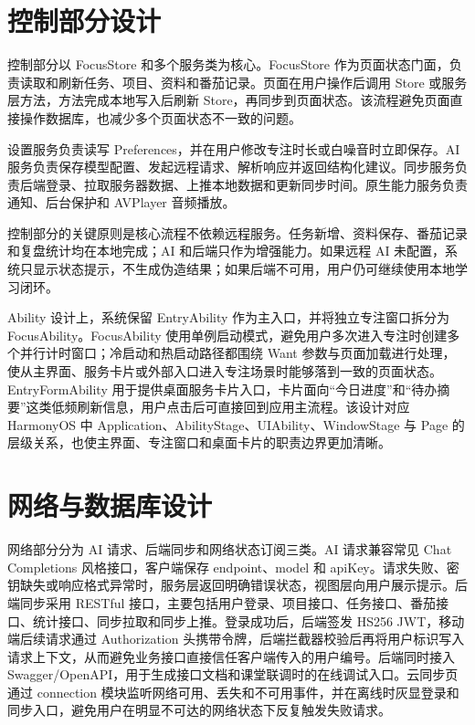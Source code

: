 \section{控制部分设计}

控制部分以 FocusStore 和多个服务类为核心。FocusStore 作为页面状态门面，负责读取和刷新任务、项目、资料和番茄记录。页面在用户操作后调用 Store 或服务层方法，方法完成本地写入后刷新 Store，再同步到页面状态。该流程避免页面直接操作数据库，也减少多个页面状态不一致的问题。

设置服务负责读写 Preferences，并在用户修改专注时长或白噪音时立即保存。AI 服务负责保存模型配置、发起远程请求、解析响应并返回结构化建议。同步服务负责后端登录、拉取服务器数据、上推本地数据和更新同步时间。原生能力服务负责通知、后台保护和 AVPlayer 音频播放。

控制部分的关键原则是核心流程不依赖远程服务。任务新增、资料保存、番茄记录和复盘统计均在本地完成；AI 和后端只作为增强能力。如果远程 AI 未配置，系统只显示状态提示，不生成伪造结果；如果后端不可用，用户仍可继续使用本地学习闭环。

Ability 设计上，系统保留 EntryAbility 作为主入口，并将独立专注窗口拆分为 FocusAbility。FocusAbility 使用单例启动模式，避免用户多次进入专注时创建多个并行计时窗口；冷启动和热启动路径都围绕 Want 参数与页面加载进行处理，使从主界面、服务卡片或外部入口进入专注场景时能够落到一致的页面状态。EntryFormAbility 用于提供桌面服务卡片入口，卡片面向“今日进度”和“待办摘要”这类低频刷新信息，用户点击后可直接回到应用主流程。该设计对应 HarmonyOS 中 Application、AbilityStage、UIAbility、WindowStage 与 Page 的层级关系，也使主界面、专注窗口和桌面卡片的职责边界更加清晰。

\section{网络与数据库设计}

网络部分分为 AI 请求、后端同步和网络状态订阅三类。AI 请求兼容常见 Chat Completions 风格接口，客户端保存 endpoint、model 和 apiKey。请求失败、密钥缺失或响应格式异常时，服务层返回明确错误状态，视图层向用户展示提示。后端同步采用 RESTful 接口，主要包括用户登录、项目接口、任务接口、番茄接口、统计接口、同步拉取和同步上推。登录成功后，后端签发 HS256 JWT，移动端后续请求通过 Authorization 头携带令牌，后端拦截器校验后再将用户标识写入请求上下文，从而避免业务接口直接信任客户端传入的用户编号。后端同时接入 Swagger/OpenAPI，用于生成接口文档和课堂联调时的在线调试入口。云同步页通过 connection 模块监听网络可用、丢失和不可用事件，并在离线时灰显登录和同步入口，避免用户在明显不可达的网络状态下反复触发失败请求。

